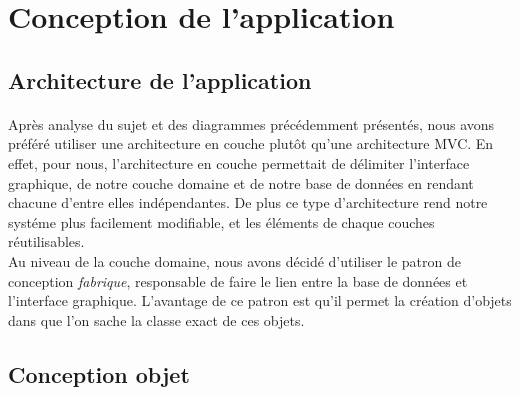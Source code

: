 \documentclass[10pt,a4paper]{report}
\begin{document}
\section{Conception de l'application}
\subsection{Architecture de l'application}
\paragraph{}Après analyse du sujet et des diagrammes précédemment présentés, nous avons préféré utiliser une architecture en couche plutôt qu'une architecture MVC. En effet, pour nous, l'architecture en couche permettait de délimiter l'interface graphique, de notre couche domaine et de notre base de données en rendant chacune d'entre elles indépendantes. De plus ce type d'architecture rend notre systéme plus facilement modifiable, et les éléments de chaque couches réutilisables.\\
\mbox{}\hspace{0.4cm}Au niveau de la couche domaine, nous avons décidé d'utiliser le patron de conception \textit{fabrique}, responsable de faire le lien entre la base de données et l'interface graphique. L'avantage de ce patron est qu'il permet la création d'objets dans que l'on sache la classe exact de ces objets.

\subsection{Conception objet}
\end{document}
